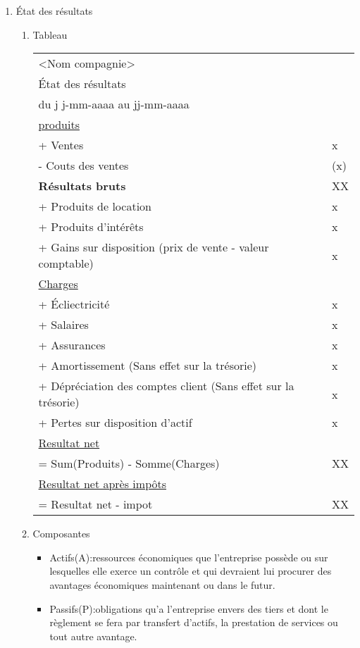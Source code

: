 \documentclass[11pt]{article}
\begin{document}
\begin{enumerate}
\begin{enumerate}
\item État des résultats
\label{sec:orgb14f678}
\begin{enumerate}
\item Tableau
\label{sec:org9a252cc}
\begin{center}
\begin{tabular}{ll}
<Nom compagnie> & \\
État des résultats & \\
du j j-mm-aaaa au jj-mm-aaaa & \\
\hline
\uline{produits} & \\
+ Ventes & x\\
- Couts des ventes & (x)\\
\textbf{Résultats bruts} & XX\\
+ Produits de location & x\\
+ Produits d'intérêts & x\\
+ Gains sur disposition (prix de vente - valeur comptable) & x\\
\uline{Charges} & \\
+ Écliectricité & x\\
+ Salaires & x\\
+ Assurances & x\\
+ Amortissement (Sans effet sur la trésorie) & x\\
+ Dépréciation des comptes client (Sans effet sur la trésorie) & x\\
+ Pertes sur disposition d'actif & x\\
\uline{Resultat net} & \\
= Sum(Produits) - Somme(Charges) & XX\\
\uline{Resultat net après impôts} & \\
= Resultat net - impot & XX\\
\end{tabular}
\end{center}
\item Composantes
\label{sec:orgede1e95}
\begin{itemize}
\item Actifs(A):ressources économiques que l’entreprise possède ou sur lesquelles
elle exerce un contrôle et qui devraient lui procurer des avantages
économiques maintenant ou dans le futur.

\item Passifs(P):obligations qu’a l’entreprise envers des tiers et dont le
règlement se fera par transfert d’actifs, la prestation de services ou tout
autre avantage.


\end{itemize}
\end{enumerate}
\end{enumerate}
\end{enumerate}
\end{document}

